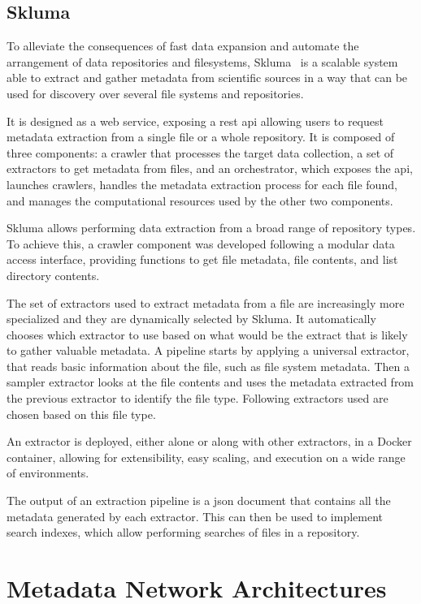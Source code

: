 \subsection*{Skluma}
To alleviate the consequences of fast data expansion and automate the arrangement of data repositories and filesystems, Skluma~\cite{skluma} is a scalable system able to extract and gather metadata from scientific sources in a way that can be used for discovery over several file systems and repositories.

It is designed as a web service, exposing a \gls{rest} \gls{api} allowing users to request metadata extraction from a single file or a whole repository.
It is composed of three components: a crawler that processes the target data collection, a set of extractors to get metadata from files, and an orchestrator, which exposes the \gls{api}, launches crawlers, handles the metadata extraction process for each file found, and manages the computational resources used by the other two components.

Skluma allows performing data extraction from a broad range of repository types.
To achieve this, a crawler component was developed following a modular data access interface, providing functions to get file metadata, file contents, and list directory contents.

The set of extractors used to extract metadata from a file are increasingly more specialized and they are dynamically selected by Skluma.
It automatically chooses which extractor to use based on what would be the extract that is likely to gather valuable metadata.
A pipeline starts by applying a universal extractor, that reads basic information about the file, such as file system metadata.
Then a sampler extractor looks at the file contents and uses the metadata extracted from the previous extractor to identify the file type.
Following extractors used are chosen based on this file type.

An extractor is deployed, either alone or along with other extractors, in a Docker container, allowing for extensibility, easy scaling, and execution on a wide range of environments.

The output of an extraction pipeline is a \gls{json} document that contains all the metadata generated by each extractor.
This can then be used to implement search indexes, which allow performing searches of files in a repository.

\section{Metadata Network Architectures}

